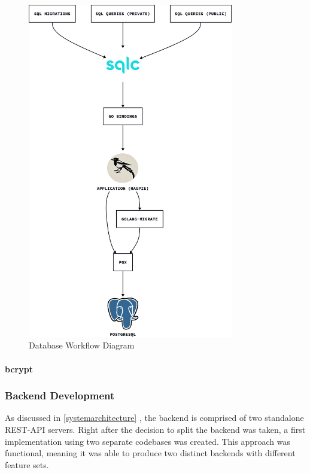 \begin{figure}[htbp]
  \centering{}
  \includegraphics[width=0.8\textwidth]{../d2-diagrams/database_workflow.png}
  \caption{Database Workflow Diagram}
  \label{fig:database_workflow_diagram}
\end{figure}

\paragraph{bcrypt}


\subsubsection{Backend Development}
As discussed in \ref{systemarchitecture} , the
backend is comprised of two standalone REST-API servers. Right after the
decision to split the backend was taken, a first implementation using two
separate codebases was created. This approach was functional, meaning it was
able to produce two distinct backends with different feature sets.


